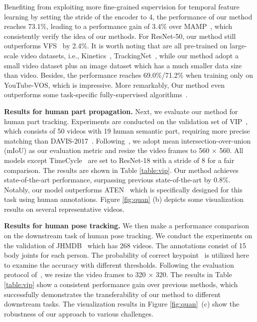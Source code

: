 \documentclass{article}
\begin{document}
Benefiting from exploiting more fine-grained supervision for temporal feature learning by setting the stride of the encoder to 4, the performance of our method reaches 73.1\%, leading to a performance gain of 3.4\% over MAMP~\cite{miao2021self}, which consistently verify the idea of our methods.
For ResNet-50, our method still outperforms VFS~\cite{xu2021rethinking} by 2.4\%. It is worth noting that \cite{jabri2020space}\cite{li2019joint}\cite{wang2020contrastive}\cite{xu2021rethinking}\cite{zhao2021modelling} are all pre-trained on large-scale video datasets, i.e., Kinetics~\cite{carreira2017quo}, TrackingNet~\cite{muller2018trackingnet}, while our method adopt a small video dataset plus an image dataset which has a much smaller data size than video.  Besides, the performance reaches 69.0\%/71.2\% when training only on YouTube-VOS, which is impressive.  More remarkably, Our method even outperforms some task-specific fully-supervised algorithms~\cite{maninis2018video}\cite{voigtlaender2017online}\cite{voigtlaender2019feelvos}.



\textbf{Results for human part propagation.} Next, we evaluate our method for human part tracking. Experiments are conducted on the validation set of VIP~\cite{zhou2018adaptive}, which consists of 50 videos with 19 human semantic part, requiring more precise matching than DAVIS-2017~\cite{pont20172017}. Following~\cite{zhou2018adaptive}, we adopt mean intersection-over-union (mIoU) as our evaluation metric and resize the video frames to 560 $\times$ 560. All models except TimeCycle~\cite{wang2019learning} are set to ResNet-18 with a stride of 8 for a fair comparison. The results are shown in Table \ref{table:vip}. Our method achieves state-of-the-art performance, surpassing previous state-of-the-art by 0.8\%. Notably, our model outperforms ATEN~\cite{zhou2018adaptive} which is specifically designed for this task using human annotations. Figure \ref{fig:quan} (b) depicts some visualization results on several representative videos.


\textbf{Results for human pose tracking.} We then make a performance comparison on the downstream task of human pose tracking. We conduct the experiments on the validation of JHMDB~\cite{jhuang2013towards} which has 268 videos. The annotations consist of 15 body joints for each person. The probability of correct keypoint~\cite{yang2012articulated} is utilized here to examine the accuracy  with different thresholds. Following the evaluation protocol of~\cite{jabri2020space}\cite{li2019joint}, we resize the video frames to 320 $\times$ 320. The results in Table \ref{table:vip} show a consistent performance gain over previous methods, which successfully demonstrates the transferability of our method to different downstream tasks. The visualization results in Figure \ref{fig:quan}~(c) show the robustness of our approach to various challenges.
\end{document}
